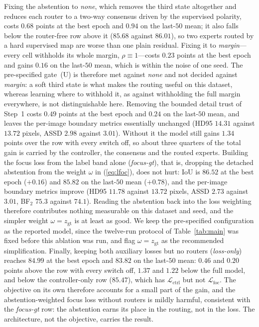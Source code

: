 Fixing the abstention to \emph{none}, which removes the third state altogether and reduces each router to a two-way consensus driven by the supervised polarity, costs $0.68$ points at the best epoch and $0.94$ on the last-$50$ mean; it also falls below the router-free row above it ($85.68$ against $86.01$), so two experts routed by a hard supervised map are worse than one plain residual. Fixing it to \emph{margin}---every cell withholds its whole margin, $\rho\equiv1$---costs $0.23$ points at the best epoch and gains $0.16$ on the last-$50$ mean, which is within the noise of one seed. The pre-specified gate~(U) is therefore met against \emph{none} and not decided against \emph{margin}: a soft third state is what makes the routing useful on this dataset, whereas learning where to withhold it, as against withholding the full margin everywhere, is not distinguishable here. Removing the bounded detail trust of Step~1 costs $0.49$ points at the best epoch and $0.24$ on the last-$50$ mean, and leaves the per-image boundary metrics essentially unchanged (HD95 $14.31$ against $13.72$ pixels, ASSD $2.98$ against $3.01$). Without it the model still gains $1.34$ points over the row with every switch off, so about three quarters of the total gain is carried by the controller, the consensus and the routed experts. Building the focus loss from the label band alone (\emph{focus-gt}), that is, dropping the detached abstention from the weight $\omega$ in (\ref{eq:lfoc}), does not hurt: IoU is $86.52$ at the best epoch ($+0.16$) and $85.82$ on the last-$50$ mean ($+0.78$), and the per-image boundary metrics improve (HD95 $11.78$ against $13.72$ pixels, ASSD $2.73$ against $3.01$, BF$_2$ $75.3$ against $74.1$). Reading the abstention back into the loss weighting therefore contributes nothing measurable on this dataset and seed, and the simpler weight $\omega=z_{\mathrm{gt}}$ is at least as good. We keep the pre-specified configuration as the reported model, since the twelve-run protocol of Table~\ref{tab:main} was fixed before this ablation was run, and flag $\omega=z_{\mathrm{gt}}$ as the recommended simplification. Finally, keeping both auxiliary losses but no routers (\emph{loss-only}) reaches $84.99$ at the best epoch and $83.82$ on the last-$50$ mean: $0.46$ and $0.20$ points above the row with every switch off, $1.37$ and $1.22$ below the full model, and below the controller-only row ($85.47$), which has $\mathcal{L}_{\mathrm{ctrl}}$ but not $\mathcal{L}_{\mathrm{foc}}$. The objective on its own therefore accounts for a small part of the gain, and the abstention-weighted focus loss without routers is mildly harmful, consistent with the \emph{focus-gt} row: the abstention earns its place in the routing, not in the loss. The architecture, not the objective, carries the result.

